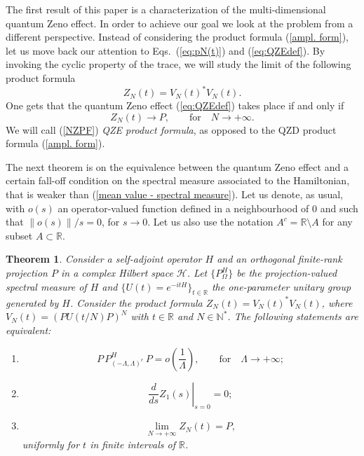 \documentclass[aip,jmp,12pt
]{revtex4}
\newcommand{\RM}{\mathbb{R}}
\newcommand{\NM}{\mathbb{N}}
\newtheorem{theorem}{Theorem}
\theoremstyle{definition}
\begin{document}
The first result of this paper is a characterization of the multi-dimensional quantum Zeno
effect. In order to achieve our goal we look at the problem from a different perspective. Instead of considering the product formula (\ref{ampl. form}), let us move back our attention to Eqs.~(\ref{eq:pN(t)}) and (\ref{eq:QZEdef}). By invoking the cyclic property of the trace, we will study the limit of the following product formula
\begin{equation}\label{NZPF}
Z_N(t)=V_{N}(t)^{*}V_{N}(t).
\end{equation}
One gets that the quantum Zeno effect (\ref{eq:QZEdef}) takes place if and only if
\begin{equation}
\label{eq:limit NZPF}
Z_N(t) \to P, \qquad \text{for} \quad N\to +\infty .
\end{equation}
We will call (\ref{NZPF}) \emph{QZE product formula}, as opposed to the QZD product formula (\ref{ampl. form}).




The next theorem is on the equivalence between the quantum Zeno effect and a certain fall-off condition on the spectral measure associated to the Hamiltonian,  that is weaker than (\ref{mean value
- spectral measure}).
Let us denote, as usual, with
$o(s)$ an operator-valued function defined in a neighbourhood of $0$ and such that
$\|o(s)\|/s =0$, for $s\to 0$. Let us also use the notation $A^c = \RM\setminus A$ for any subset $A\subset\RM$.


\begin{theorem}\label{iff condition QZE multidimensional}
Consider  a self-adjoint operator  $H$ and an orthogonal
finite-rank projection $P$ in a complex Hilbert space
$\mathcal{H}$. Let  $\{P_{\Omega}^H\}$ be the projection-valued
spectral measure  of $H$ and $\{U(t)=e^{-itH}\}_{t \in \RM}$ the
one-parameter unitary group generated by $H$. Consider the product
formula $Z_N(t)=V_{N}(t)^{*}V_{N}(t)$, where
$V_{N}(t)=(PU(t/N)P)^{N}$ with $t \in \RM$ and $N \in \NM^*$. The
following statements are equivalent:
\begin{enumerate}
    \item \label{fdtc}
    \begin{equation*}
      P\, P_{(-\Lambda,\Lambda)^c}^H \, P= o\left( \frac{1}{\Lambda} \right), \qquad \mathrm{for} \quad \Lambda \to + \infty;
       \end{equation*}
    \item
      \begin{equation*}
        \left. \frac{d}{ds} Z_1(s) \right|_{s=0}=0;
      \end{equation*}
    \item
    \begin{equation*}
      \lim_{N \to +\infty} Z_{N}(t)=P,
    \end{equation*}
    uniformly for $t$ in finite intervals of $\RM$.
\end{enumerate}
\end{theorem}
\end{document}

